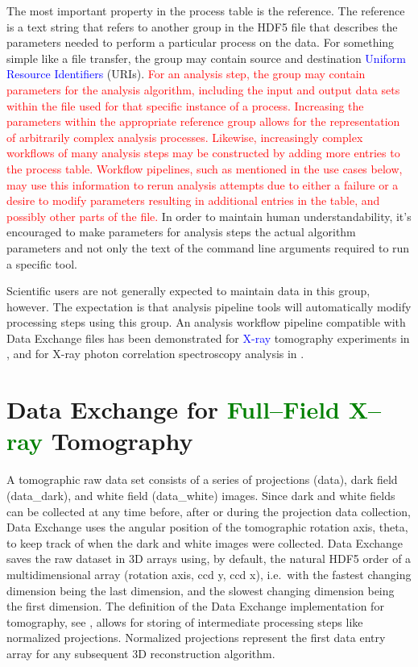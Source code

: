\documentclass[pdf]{iucr}              %
\begin{document}
The most important property in the process table is the reference. The reference is a text string that refers to another group in the HDF5 file that describes the parameters needed to perform a particular process on the data. For something simple like a file transfer, the group may contain source and destination \textcolor{blue}{Uniform Resource Identifiers} (URIs). \textcolor{red}{For an analysis step, the group may contain parameters for the analysis algorithm, including the input and output data sets within the file used for that specific instance of a process. Increasing the parameters within the appropriate reference group allows for the representation of arbitrarily complex analysis processes. Likewise, increasingly complex workflows of many analysis steps may be constructed by adding more entries to the process table. Workflow pipelines, such as mentioned in the use cases below, may use this information to rerun analysis attempts due to either a failure or a desire to modify parameters resulting in additional entries in the table, and possibly other parts of the file.} In order to maintain human understandability, it's encouraged to make parameters for analysis steps the actual algorithm parameters and not only the text of the command line arguments required to run a specific tool.

Scientific users are not generally expected to maintain data in this group, however. The expectation is that analysis pipeline tools will automatically modify processing steps using this group. An analysis workflow pipeline compatible with Data Exchange files has been demonstrated for \textcolor{blue}{X-ray} tomography experiments in \cite{schwarz_icalepcs_2013}, and for X-ray photon correlation spectroscopy analysis in \cite{khan_icalepcs_2013}.

\section{Data Exchange for \textcolor{green}{Full--Field X--ray} Tomography}

A tomographic raw data set consists of a series of projections (data), dark field (data\_dark), and white field (data\_white) images. Since dark and white fields can be collected at any time before, after or during the projection data collection, Data Exchange uses the angular position of the tomographic rotation axis, theta, to keep track of when the dark and white images were collected. Data Exchange saves the raw dataset in 3D arrays using, by default, the natural HDF5 order of a multidimensional array (rotation axis, ccd y, ccd x), i.e.\  with the fastest changing dimension being the last dimension, and the slowest changing dimension being the first dimension. The definition of the Data Exchange implementation for tomography, see \cite{data_exchange}, allows for storing of intermediate processing steps like normalized projections. Normalized projections represent the first data entry array for any subsequent 3D reconstruction algorithm.
\end{document}
